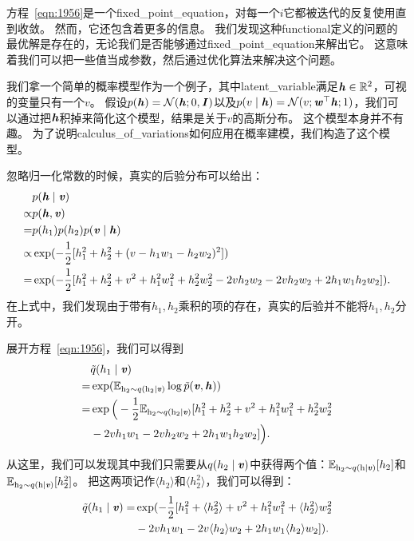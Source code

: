 方程~\eqref{eqn:1956}是一个\gls{fixed_point_equation}，对每一个$i$它都被迭代的反复使用直到收敛。
然而，它还包含着更多的信息。
我们发现这种\gls{functional}定义的问题的最优解是存在的，无论我们是否能够通过\gls{fixed_point_equation}来解出它。
这意味着我们可以把一些值当成参数，然后通过优化算法来解决这个问题。


我们拿一个简单的概率模型作为一个例子，其中\gls{latent_variable}满足$\boldsymbol{\mathit{h}}\in\mathbb{R}^2$，可视的变量只有一个$v$。
假设$p(\boldsymbol{\mathit{h}}) = \mathcal{N}(\boldsymbol{\mathit{h}};0,\boldsymbol{\mathit{I}})$以及$p(v\mid\boldsymbol{\mathit{h}}) = \mathcal{N}(v;\boldsymbol{\mathit{w}}^{\top}\boldsymbol{\mathit{h}};1)$，我们可以通过把$\boldsymbol{\mathit{h}}$积掉来简化这个模型，结果是关于$v$的高斯分布。
这个模型本身并不有趣。
为了说明\gls{calculus_of_variations}如何应用在概率建模，我们构造了这个模型。



忽略归一化常数的时候，真实的后验分布可以给出：
\begin{align}
	\label{eqn:1957}
   & p(\boldsymbol{\mathit{h}}\mid\boldsymbol{\mathit{v}})\\
 \propto & p(\boldsymbol{\mathit{h}}, \boldsymbol{\mathit{v}})\\
 = & p(h_1) p(h_2) p(\boldsymbol{\mathit{v}}\mid\boldsymbol{\mathit{h}})\\
 \propto & \exp(-\frac{1}{2} [h_1^2 + h_2^2 + (v-h_1w_1 - h_2w_2)^2])\\
 = & \exp(-\frac{1}{2}[h_1^2 + h_2^2 + v^2 + h_1^2w_1^2 + h_2^2w_2^2 - 2vh_2w_2 - 2vh_2w_2 + 2h_1w_1h_2w_2]).
\end{align}
在上式中，我们发现由于带有$h_1,h_2$乘积的项的存在，真实的后验并不能将$h_1,h_2$分开。



展开方程~\eqref{eqn:1956}，我们可以得到
\begin{align}
\label{eqn:1962}
& \tilde{q}(h_1\mid\boldsymbol{\mathit{v}})\\ = & \exp(\mathbb{E}_{\mathrm{h}_2\sim q(\mathrm{h}_2\mid\boldsymbol{\mathit{v}})} \log \tilde{p}(\boldsymbol{\mathit{v}},\boldsymbol{\mathit{h}}))\\
= & \exp\Big( -\frac{1}{2} \mathbb{E}_{\mathrm{h}_2\sim q(\mathrm{h}_2\mid\boldsymbol{\mathit{v}})} [h_1^2 + h_2^2 + v^2 + h_1^2w_1^2 + h_2^2w_2^2 \\
& -2vh_1w_1 - 2vh_2w_2 + 2h_1w_1h_2w_2]\Big).
\end{align}


从这里，我们可以发现其中我们只需要从$q(h_2\mid \boldsymbol{\mathit{v}})$中获得两个值：$\mathbb{E}_{\mathrm{h}_2\sim q(\mathrm{h}\mid\boldsymbol{\mathit{v}})}[h_2]$和$\mathbb{E}_{\mathrm{h}_2\sim q(\mathrm{h}\mid\boldsymbol{\mathit{v}})}[h_2^2]$。
把这两项记作$\langle h_2 \rangle$和$\langle h_2^2 \rangle$，我们可以得到：
\begin{align}
\label{eqn:1966}
\tilde{q}(h_1\mid\boldsymbol{\mathit{v}}) = & \exp(-\frac{1}{2} [h_1^2 + \langle h_2^2 \rangle  + v^2 + h_1^2w_1^2 + \langle h_2^2 \rangle w_2^2 
\\ &	-2vh_1w_1 - 2v\langle h_2 \rangle w_2 + 2h_1w_1\langle h_2 \rangle w_2]).	
\end{align}


